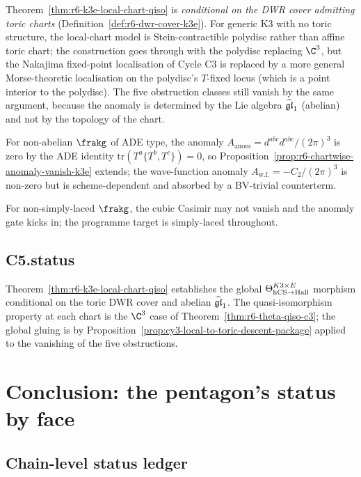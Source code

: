 \begin{remark}
\label{rem:r6-conditional-scope-k3e}
Theorem~\ref{thm:r6-k3e-local-chart-qiso} is
\emph{conditional on the DWR cover admitting toric charts}
(Definition~\ref{def:r6-dwr-cover-k3e}). For generic K3 with no toric
structure, the local-chart model is Stein-contractible polydisc rather
than affine toric chart; the construction goes through with the
polydisc replacing $\C^3$, but the Nakajima fixed-point localisation
of Cycle C3 is replaced by a more general Morse-theoretic
localisation on the polydisc's $T$-fixed locus (which is a point
interior to the polydisc). The five obstruction classes still vanish
by the same argument, because the anomaly is determined by the Lie
algebra $\widehat{\mathfrak{gl}}_1$ (abelian) and not by the topology of the chart.

For non-abelian $\frakg$ of ADE type, the anomaly
$A_{\mathrm{anom}} = d^{abc}d^{abc}/(2\pi)^3$ is zero by the ADE
identity $\mathrm{tr}(T^a\{T^b,T^c\}) = 0$, so
Proposition~\ref{prop:r6-chartwise-anomaly-vanish-k3e} extends; the
wave-function anomaly $A_{\mathrm{w.f.}} = -C_2/(2\pi)^3$ is non-zero
but is scheme-dependent and absorbed by a BV-trivial counterterm.

For non-simply-laced $\frakg$, the cubic Casimir may not vanish and
the anomaly gate kicks in; the programme target is simply-laced
throughout.
\end{remark}

\subsection*{C5.status}

Theorem~\ref{thm:r6-k3e-local-chart-qiso} establishes the global
$\Theta_{\mathrm{hCS}\to\mathrm{Hall}}^{K3\times E}$ morphism conditional on the
toric DWR cover and abelian $\widehat{\mathfrak{gl}}_1$. The quasi-isomorphism property
at each chart is the $\C^3$ case of Theorem~\ref{thm:r6-theta-qiso-c3};
the global gluing is by Proposition~\ref{prop:cy3-local-to-toric-descent-package}
applied to the vanishing of the five obstructions.

\section*{Conclusion: the pentagon's status by face}

\subsection*{Chain-level status ledger}

